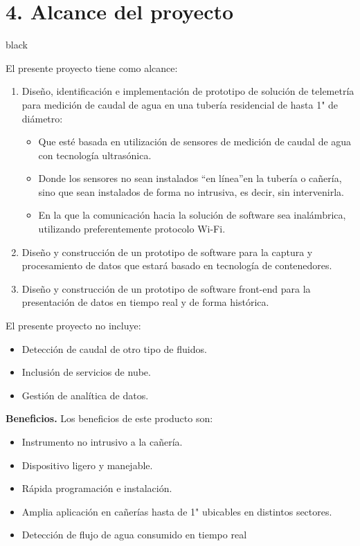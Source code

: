 \documentclass[
11pt, %
codirector, %
]{charter}
\begin{document}
\section{4. Alcance del proyecto}
\label{sec:alcance}

\begin{consigna}{black}

El presente proyecto tiene como alcance:

\begin{enumerate}
\item Diseño, identificación e implementación de prototipo de solución de telemetría para medición de caudal de agua en una tubería residencial de hasta 1" de diámetro:
\begin{itemize}
	\item Que esté basada en utilización de sensores de medición de caudal de agua con tecnología ultrasónica.
	\item Donde los sensores no sean instalados \textquotedblleft{en línea}\textquotedblright  en la tubería o cañería, sino que sean instalados de forma no intrusiva, es decir, sin intervenirla.
	\item En la que la comunicación hacia la solución de software sea inalámbrica, utilizando preferentemente protocolo Wi-Fi.
\end{itemize}

\item Diseño y construcción de un prototipo de software para la captura y procesamiento de datos que estará basado en tecnología de contenedores.

\item Diseño y construcción de un prototipo de software front-end para la presentación de datos en tiempo real y de forma histórica.

\end{enumerate}

El presente proyecto no incluye:

\begin{itemize}
	\item Detección de caudal de otro tipo de fluidos.
	\item Inclusión de servicios de nube.
	\item Gestión de analítica de datos.
\end{itemize}

\textbf{Beneficios.}  
Los beneficios de este producto son:
\begin{itemize}
	\item Instrumento no intrusivo a la cañería.
	\item Dispositivo ligero y manejable.
	\item Rápida programación e instalación.
	\item Amplia aplicación en cañerías hasta de 1" ubicables en distintos sectores.
	\item Detección de flujo de agua consumido en tiempo real
\end{itemize}
\end{consigna}
\end{document}
